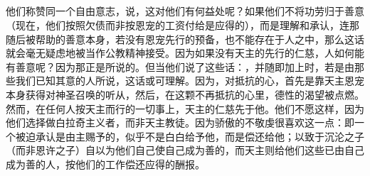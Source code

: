 
\subsection{}

他们称赞同一个自由意志，说，这对他们有何益处呢？如果他们不将功劳归于善意（现在，他们按照欠债而非按恩宠的工资付给是应得的），而是理解和承认，连那随后被帮助的善意本身，若没有恩宠先行的预备，也不能存在于人之中，那么这话就会毫无疑虑地被当作公教精神接受。因为如果没有天主的先行的仁慈，人如何能有善意呢？因为那正是所说的。但当他们说了这些话：，并随即加上时，若是由那些我们已知其意的人所说，这话或可理解。因为，对抵抗的心，首先是靠天主恩宠本身获得对神圣召唤的听从，然后，在这颗不再抵抗的心里，德性的渴望被点燃。然而，在任何人按天主而行的一切事上，天主的仁慈先于他。他们不愿这样，因为他们选择做白拉奇主义者，而非天主教徒。因为骄傲的不敬虔很喜欢这一点：即一个被迫承认是由主赐予的，似乎不是白白给予他，而是偿还给他；以致于沉沦之子（而非恩许之子）自以为他们自己使自己成为善的，而天主则给他们这些已由自己成为善的人，按他们的工作偿还应得的酬报。\par


\subsection{}

